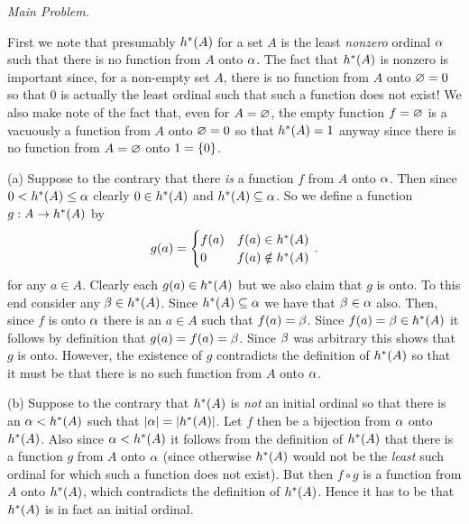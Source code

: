 \begin{solution}
    \emph{Main Problem.}

    First we note that presumably $h^*(A)$ for a set $A$ is the least \emph{nonzero} ordinal $\alpha$ such that there is no function from $A$ onto $\alpha$.
    The fact that $h^*(A)$ is nonzero is important since, for a non-empty set $A$, there is no function from $A$ onto $\varnothing = 0$ so that $0$ is actually the least ordinal such that such a function does not exist!
    We also make note of the fact that, even for $A=\varnothing$, the empty function $f = \varnothing$ is a vacuously a function from $A$ onto $\varnothing = 0$ so that $h^*(A) = 1$ anyway since there is no function from $A = \varnothing$ onto $1 = \left\{ 0 \right\}$.

	(a) Suppose to the contrary that there \emph{is} a function $f$ from $A$ onto $\alpha$.
    Then since $0 < h^*(A) \leq \alpha$ clearly $0 \in h^*(A)$ and $h^*(A) \subseteq \alpha$.
    So we define a function $g : A \to h^*(A)$ by
    $$
    g(a) = \begin{cases}
         f(a) & f(a) \in h^*(A) \\
         0 & f(a) \notin h^*(A)
    \end{cases} \,.
    $$
    for any $a \in A$.
    Clearly each $g(a) \in h^*(A)$ but we also claim that $g$ is onto.
    To this end consider any $\beta \in h^*(A)$.
    Since $h^*(A) \subseteq \alpha$ we have that $\beta \in \alpha$ also.
    Then, since $f$ is onto $\alpha$ there is an $a \in A$ such that $f(a) = \beta$.
    Since $f(a) = \beta \in h^*(A)$ it follows by definition that $g(a) = f(a) = \beta$.
    Since $\beta$ was arbitrary this shows that $g$ is onto.
    However, the existence of $g$  contradicts the definition of $h^*(A)$ so that it must be that there is no such function from $A$ onto $\alpha$. \qedsymbol

    (b) Suppose to the contrary that $h^*(A)$ is \emph{not} an initial ordinal so that there is an $\alpha < h^*(A)$ such that $\left| \alpha \right| = \left| h^*(A) \right|$.
    Let $f$ then be a bijection from $\alpha$ onto $h^*(A)$.
    Also since $\alpha < h^*(A)$ it follows from the definition of $h^*(A)$ that there is a function $g$ from $A$ onto $\alpha$ (since otherwise $h^*(A)$ would not be the \emph{least} such ordinal for which such a function does not exist).
    But then $f \circ g$ is a function from $A$ onto $h^*(A)$, which contradicts the definition of $h^*(A)$.
    Hence it has to be that $h^*(A)$ is in fact an initial ordinal.


\end{solution}
